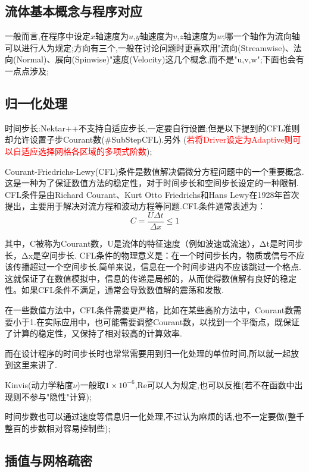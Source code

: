 \subsection{流体基本概念与程序对应}
一般而言,在程序中设定$x$轴速度为$u$,$y$轴速度为$v$,$z$轴速度为$w$;哪一个轴作为流向轴可以进行人为规定;方向有三个,一般在讨论问题时更喜欢用"流向(Streamwise)、法向(Normal)、展向(Spinwise)"速度(Velocity)这几个概念,而不是"u,v,w";下面也会有一点点涉及;


\subsection{归一化处理}


时间步长:Nektar++不支持自适应步长,一定要自行设置;但是以下提到的CFL准则却允许设置子步Courant数(\#SubStepCFL).另外
(\textcolor{red}{若将Driver设定为Adaptive则可以自适应选择网格各区域的多项式阶数});\par
Courant-Friedrichs-Lewy(CFL)条件是数值解决偏微分方程问题中的一个重要概念.这是一种为了保证数值方法的稳定性，对于时间步长和空间步长设定的一种限制.
CFL条件是由Richard Courant、Kurt Otto Friedrichs和Hans Lewy在1928年首次提出，主要用于解决对流方程和波动方程等问题.CFL条件通常表述为：
$$
C = \frac{U \Delta t}{\Delta x}\leq 1
$$
\par
其中，C被称为Courant数，U是流体的特征速度（例如波速或流速），Δt是时间步长，Δx是空间步长.
CFL条件的物理意义是：在一个时间步长内，物质或信号不应该传播超过一个空间步长.简单来说，信息在一个时间步进内不应该跳过一个格点.这就保证了在数值模拟中，信息的传递是局部的，从而使得数值解有良好的稳定性。如果CFL条件不满足，通常会导致数值解的震荡和发散.\par
在一些数值方法中，CFL条件需要更严格，比如在某些高阶方法中，Courant数需要小于1.在实际应用中，也可能需要调整Courant数，以找到一个平衡点，既保证了计算的稳定性，又保持了相对较高的计算效率.\par
而在设计程序的时间步长时也常常需要用到归一化处理的单位时间,所以就一起放到这里来讲了.\par

Kinvis(动力学粘度$\nu$)一般取$1\times 10^{-6}$,Re可以人为规定,也可以反推(若不在函数中出现则不参与"隐性"计算);

时间步数也可以通过速度等信息归一化处理,不过认为麻烦的话,也不一定要做(整千整百的步数相对容易控制些);

\subsection{插值与网格疏密}

